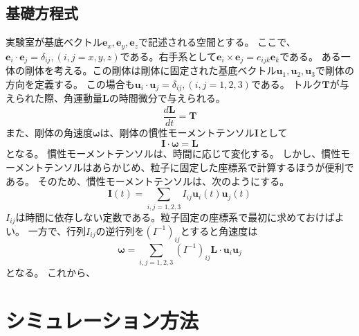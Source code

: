 \documentclass[a4paper,11pt]{jbook}
\begin{document}
\section{基礎方程式}
実験室が基底ベクトル$\bm{e}_x, \bm{e}_y,\bm{e}_z $で記述される空間とする。
ここで、$\bm{e}_i\cdot\bm{e}_j=\delta_{ij}, (i,j=x,y,z)$である。右手系として$\bm{e}_i\times\bm{e}_j=e_{ijk}\bm{e}_k$である。
ある一体の剛体を考える。この剛体は剛体に固定された基底ベクトル$\bm{u}_1,\bm{u}_2,\bm{u}_3$で剛体の方向を定義する。
この場合も$\bm{u}_i\cdot\bm{u}_j=\delta_{ij}, (i,j=1,2,3)$である。
トルク$\bm{T}$が与えられた際、角運動量$\bm{L}$の時間微分で与えられる。
\begin{equation}
\frac{d\bm{L}}{dt}=\bm{T}
\end{equation}
また、剛体の角速度$\bm{\omega}$は、剛体の慣性モーメントテンソル$\bm{I}$として
\begin{equation}
\bm{I}\cdot\bm{\omega}=\bm{L}
\end{equation}
となる。
慣性モーメントテンソルは、時間に応じて変化する。
しかし、慣性モーメントテンソルはあらかじめ、粒子に固定した座標系で計算するほうが便利である。
そのため、慣性モーメントテンソルは、次のようにする。
\begin{equation}
\bm{I}(t)=\sum_{i,j=1,2,3}I_{ij}\bm{u}_i(t)\bm{u}_j(t)
\end{equation}
$I_{ij}$は時間に依存しない定数である。粒子固定の座標系で最初に求めておけばよい。
一方で、行列$I_{ij}$の逆行列を$(I^{-1})_{ij}$とすると角速度は
 \begin{equation}
 \bm{\omega}=\sum_{i,j=1,2,3}(I^{-1})_{ij}\bm{L}\cdot\bm{u}_i\bm{u}_j
 \end{equation}
 となる。
 これから、
\chapter{シミュレーション方法}
\chapter{}
 
  
\end{document}
